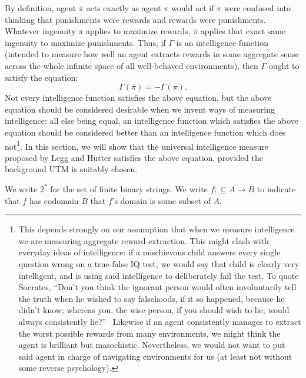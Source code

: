 \documentclass{article}
\begin{document}
By definition, agent $\overline\pi$ acts exactly as agent $\pi$ would
act if $\pi$ were confused into thinking that punishments were rewards
and rewards were punishments.
Whatever ingenuity $\pi$ applies to maximize rewards,
$\overline\pi$ applies that exact same ingenuity to maximize punishments.
Thus, if $\Gamma$ is an intelligence function (intended to measure how
well an agent extracts rewards in some aggregate sense across the whole
infinite space of all well-behaved environments), then $\Gamma$ ought
to satisfy the equation:
\[
    \Gamma(\overline\pi) = -\Gamma(\pi).
\]
Not every intelligence function satisfies the above equation, but the
above equation should be considered desirable when we
invent ways of measuring intelligence: all else being equal, an
intelligence function which satisfies the above equation should be
considered better than an intelligence function which does
not\footnote{This depends strongly on our assumption that when we
measure intelligence we are measuring aggregate reward-extraction. This might clash
with everyday ideas of intelligence: if a mischievous child answers every single
question wrong on a true-false IQ test, we would say that child is clearly very
intelligent, and is using said intelligence to deliberately fail the test.
To quote Socrates, ``Don't you think the ignorant person would often involuntarily
tell the truth when he wished to say falsehoods, if it so happened, because he
didn't know; whereas you, the wise person, if you should wish to lie,
would always consistently lie?''\ \cite{lesserhippias}
Likewise if an agent consistently manages to extract the worst possible rewards
from many environments, we might think the agent is brilliant but
masochistic.
Nevertheless, we would not want to put said agent
in charge of navigating environments for us (at least not without some
reverse psychology).}.
In this section, we will show that the universal intelligence measure
proposed by Legg and Hutter satisfies the above equation, provided the
background UTM is suitably chosen.

We write $2^*$ for the set of finite binary strings.
We write $f:\subseteq A\to B$ to indicate that $f$ has codomain $B$
that $f$'s domain is some subset of $A$.
\end{document}
